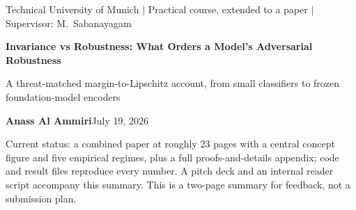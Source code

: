 \documentclass[10pt]{article}
\begin{document}
\thispagestyle{fancy}

{\small\color{blue!60!black}Technical University of Munich \hspace{0.3em}$\vert$\hspace{0.3em} Practical course, extended to a paper \hspace{0.3em}$\vert$\hspace{0.3em} Supervisor: M.\ Sabanayagam}

\vspace{0.3em}
{\Large\bfseries Invariance vs Robustness: What Orders a Model's Adversarial Robustness\par}
\vspace{0.1em}
{\normalsize A threat-matched margin-to-Lipschitz account, from small classifiers to frozen foundation-model encoders\par}
\vspace{0.3em}
{\normalsize\bfseries Anass Al Ammiri}\hfill {\small July 19, 2026}

\vspace{0.3em}
{\small Current status: a combined paper at roughly 23 pages with a central concept figure and five empirical regimes, plus a full proofs-and-details appendix; code and result files reproduce every number. A pitch deck and an internal reader script accompany this summary. This is a two-page summary for feedback, not a submission plan.}
\vspace{0.3em}
\end{document}
